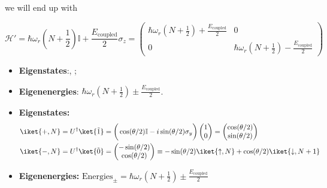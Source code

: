 \begin{enumerate}
  \noindent we will end up with
  \begin{framed}\noindent
    \[    \mathcal{H'}   =    \hbar\omega_r(N+\frac{1}{2})\mathbb{I}   +
      \frac{E_\text{coupled}}{2}\sigma_z        =        \begin{pmatrix}
        \hbar\omega_r(N+\frac{1}{2})   +  \frac{E_\text{coupled}}{2}   &
        0\\0& \hbar\omega_r(N+\frac{1}{2}) - \frac{E_\text{coupled}}{2}
      \end{pmatrix}
    \]
    \begin{itemize}
    \item          \textbf{Eigenstates}:\hfill         {},
      ;
    \item                 \textbf{Eigenenergies}:                 \hfill
      $ \hbar\omega_r(N+\frac{1}{2}) \pm \frac{E_\text{coupled}}{2} $.
    \end{itemize}

  \end{framed}

  \begin{framed}\noindent

    \begin{itemize}
    \item \textbf{Eigenstates:}
      \[
        \begin{aligned}
          \iket{+,N}       &        =       U^{\dagger}\ket{\tilde{1}}       =
          \bigg(\cos(\theta/2)\mathbb{I}-i\sin(\theta/2)\sigma_y\bigg)
          \begin{pmatrix}1\\0 \end{pmatrix} =
          \begin{pmatrix} \cos(\theta/2)\\\sin(\theta/2)\end{pmatrix} \\
          \iket{-,N}   &   =  U^{\dagger}\ket{\tilde{0}}   =   \begin{pmatrix}
            -\sin(\theta/2)\\\cos(\theta/2)
          \end{pmatrix} \equiv -\sin(\theta/2)\iket{\uparrow,N} + \cos(\theta/2)\iket{\downarrow,N+1}\\
        \end{aligned}
      \]
    \item                 \textbf{Eigenenergies:}                 \hfill
      $   \text{Energies}_{\pm}   =   \hbar\omega_r(N+\frac{1}{2})   \pm
      \frac{E_\text{coupled}}{2} $
    \end{itemize}

  \end{framed}
\end{enumerate}

